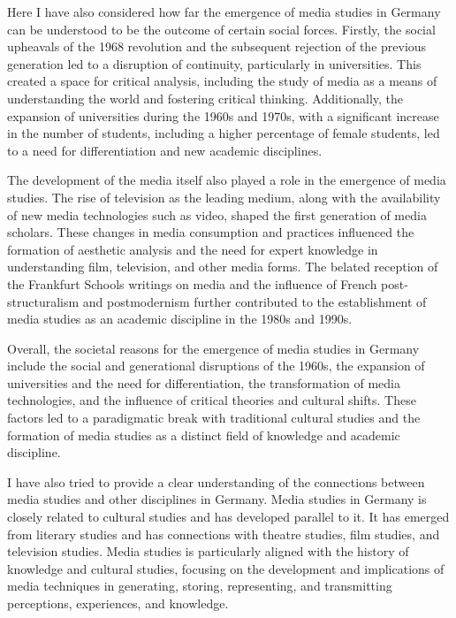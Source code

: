 \documentclass{tufte-handout}
\begin{document}
Here I have also considered how far the emergence of media studies in
Germany can be understood to be the outcome of certain social forces.
Firstly, the social upheavals of the 1968 revolution and the subsequent
rejection of the previous generation led to a disruption of continuity,
particularly in universities. This created a space for critical
analysis, including the study of media as a means of understanding the
world and fostering critical thinking. Additionally, the expansion of
universities during the 1960s and 1970s, with a significant increase in
the number of students, including a higher percentage of female
students, led to a need for differentiation and new academic
disciplines.

The development of the media itself also played a role in the emergence
of media studies. The rise of television as the leading medium, along
with the availability of new media technologies such as video, shaped
the first generation of media scholars. These changes in media
consumption and practices influenced the formation of aesthetic analysis
and the need for expert knowledge in understanding film, television, and
other media forms. The belated reception of the Frankfurt
School\textquotesingle s writings on media and the influence of French
post-structuralism and postmodernism further contributed to the
establishment of media studies as an academic discipline in the 1980s
and 1990s.

Overall, the societal reasons for the emergence of media studies in
Germany include the social and generational disruptions of the 1960s,
the expansion of universities and the need for differentiation, the
transformation of media technologies, and the influence of critical
theories and cultural shifts. These factors led to a paradigmatic break
with traditional cultural studies and the formation of media studies as
a distinct field of knowledge and academic discipline.

I have also tried to provide a clear understanding of the connections
between media studies and other disciplines in Germany. Media studies in
Germany is closely related to cultural studies and has developed
parallel to it. It has emerged from literary studies and has connections
with theatre studies, film studies, and television studies. Media
studies is particularly aligned with the history of knowledge and
cultural studies, focusing on the development and implications of media
techniques in generating, storing, representing, and transmitting
perceptions, experiences, and knowledge.
\end{document}
